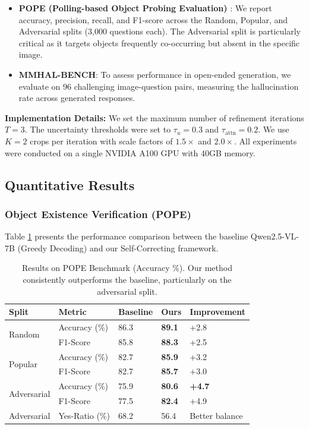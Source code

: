 \documentclass[12pt]{article}
\begin{document}
\begin{itemize}
\item \textbf{POPE (Polling-based Object Probing Evaluation)} \citep{li2023pope}: We report accuracy, precision, recall, and F1-score across the Random, Popular, and Adversarial splits (3,000 questions each). The Adversarial split is particularly critical as it targets objects frequently co-occurring but absent in the specific image.

\item \textbf{MMHAL-BENCH}: To assess performance in open-ended generation, we evaluate on 96 challenging image-question pairs, measuring the hallucination rate across generated responses.
\end{itemize}

\textbf{Implementation Details:} We set the maximum number of refinement iterations $T=3$. The uncertainty thresholds were set to $\tau_u = 0.3$ and $\tau_{\text{attn}} = 0.2$. We use $K=2$ crops per iteration with scale factors of $1.5\times$ and $2.0\times$. All experiments were conducted on a single NVIDIA A100 GPU with 40GB memory.

\subsection{Quantitative Results}

\subsubsection{Object Existence Verification (POPE)}

Table \ref{tab:pope_results} presents the performance comparison between the baseline Qwen2.5-VL-7B (Greedy Decoding) and our Self-Correcting framework.

\begin{table}[H]
\centering
\caption{Results on POPE Benchmark (Accuracy \%). Our method consistently outperforms the baseline, particularly on the adversarial split.}
\label{tab:pope_results}
\begin{tabular}{lllll}
\toprule
\textbf{Split} & \textbf{Metric} & \textbf{Baseline} & \textbf{Ours} & \textbf{Improvement} \\
\midrule
\multirow{2}{*}{Random} & Accuracy (\%) & 86.3 & \textbf{89.1} & +2.8 \\
& F1-Score & 85.8 & \textbf{88.3} & +2.5 \\
\midrule
\multirow{2}{*}{Popular} & Accuracy (\%) & 82.7 & \textbf{85.9} & +3.2 \\
& F1-Score & 82.7 & \textbf{85.7} & +3.0 \\
\midrule
\multirow{2}{*}{Adversarial} & Accuracy (\%) & 75.9 & \textbf{80.6} & \textbf{+4.7} \\
& F1-Score & 77.5 & \textbf{82.4} & +4.9 \\
\midrule
\multirow{2}{*}{Adversarial} & Yes-Ratio (\%) & 68.2 & 56.4 & Better balance \\
\bottomrule
\end{tabular}
\end{table}
\end{document}
